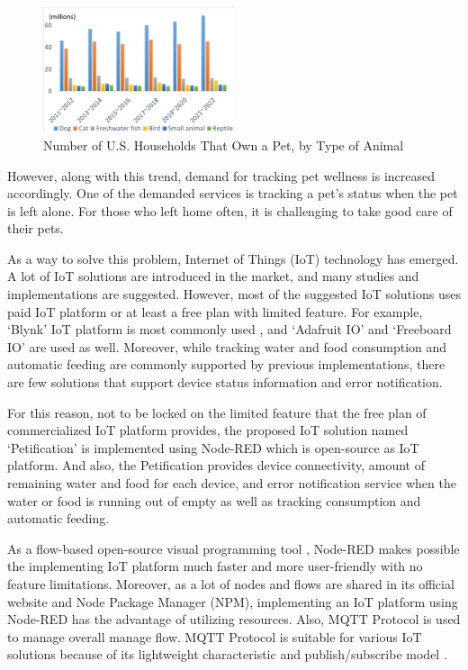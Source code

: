 \documentclass[conference]{IEEEtran}
\begin{document}
\begin{figure}[htbp]
\centerline{\includegraphics[width=0.5\textwidth]{./images/fig 1.png}}
\caption{Number of U.S. Households That Own a Pet, by Type of Animal
}
\label{fig}
\end{figure}

However, along with this trend, demand for tracking pet wellness is increased accordingly. One of the demanded services is tracking a pet’s status when the pet is left alone. For those who left home often, it is challenging to take good care of their pets.

As a way to solve this problem, Internet of Things (IoT) technology has emerged. A lot of IoT solutions are introduced in the market, and many studies and implementations are suggested.
However, most of the suggested IoT solutions uses paid IoT platform or at least a free plan with limited feature. For example, ‘Blynk’ IoT platform is most commonly used \cite{b2, b3, b4, b5}, and ‘Adafruit IO’ \cite{b6} and ‘Freeboard IO’ \cite{b7} are used as well.
Moreover, while tracking water and food consumption and automatic feeding are commonly supported by previous implementations, there are few solutions that support device status information and error notification.

For this reason, not to be locked on the limited feature that the free plan of commercialized IoT platform provides, the proposed IoT solution named ‘Petification’ is implemented using Node-RED which is open-source as IoT platform.
And also, the Petification provides device connectivity, amount of remaining water and food for each device, and error notification service when the water or food is running out of empty as well as tracking consumption and automatic feeding.

As a flow-based open-source visual programming tool \cite{b8}, Node-RED makes possible the implementing IoT platform much faster and more user-friendly with no feature limitations. Moreover, as a lot of nodes and flows are shared in its official website and Node Package Manager (NPM), implementing an IoT platform using Node-RED has the advantage of utilizing resources. Also, MQTT Protocol is used to manage overall manage flow. MQTT Protocol is suitable for various IoT solutions because of its lightweight characteristic and publish/subscribe model \cite{b9}.
\end{document}
